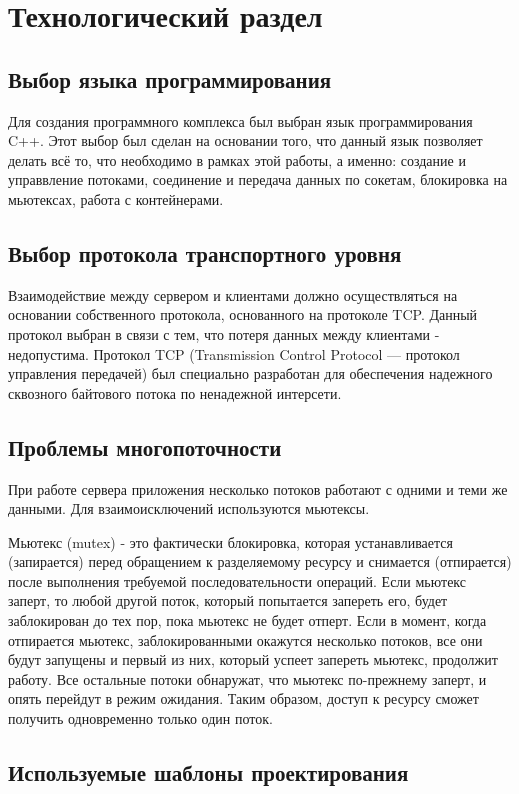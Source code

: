 \chapter{Технологический раздел}

\section{Выбор языка программирования}
Для создания программного комплекса был выбран язык программирования C++. Этот выбор был сделан на основании того, что данный язык позволяет делать всё то, что необходимо в рамках этой работы, а именно: создание и управвление потоками, соединение и передача данных по сокетам, блокировка на мьютексах, работа с контейнерами.

\section{Выбор протокола транспортного уровня}
Взаимодействие между сервером и клиентами должно осуществляться на основании собственного протокола, основанного на протоколе TCP. Данный протокол выбран в связи с тем, что потеря данных между клиентами - недопустима. Протокол TCP (Transmission Control Protocol — протокол управления передачей) был специально разработан для обеспечения надежного сквозного байтового потока по ненадежной интерсети. \cite{tanenbaum-comp-networks}

\section{Проблемы многопоточности}
При работе сервера приложения несколько потоков работают с одними и теми же данными. Для взаимоисключений используются мьютексы.

Мьютекс (mutex) - это фактически блокировка, которая устанавливается (запирается) перед обращением к разделяемому ресурсу и
снимается (отпирается) после выполнения требуемой последовательности операций. Если мьютекс заперт, то любой другой поток, который попытается запереть его, будет заблокирован до тех пор, пока мьютекс не будет отперт. Если в момент, когда отпирается мьютекс, заблокированными окажутся несколько потоков, все они будут запущены и первый из них, который успеет запереть мьютекс, продолжит работу. Все остальные потоки обнаружат, что мьютекс по-прежнему заперт, и опять перейдут в режим ожидания. Таким образом, доступ к ресурсу сможет получить одновременно только один поток. \cite{rago-unix}

\section{Используемые шаблоны проектирования}

